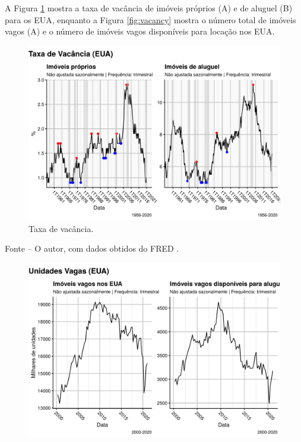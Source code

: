 \documentclass[
	12pt,				%
	oneside,			%
	a4paper,			%
	chapter=TITLE,		%
	section=TITLE,		%
	english,			%
	brazil				%
	]{abntex2}
\newcommand{\bcenter}{\begin{center}}
\newcommand{\ecenter}{\end{center}}
\begin{document}
\begin{refsection}
A Figura \ref{fig:vacancyRate} mostra a taxa de vacância de imóveis próprios (A)
e de aluguel (B) para os \gls{EUA}, enquanto a Figura \ref{fig:vacancy} mostra
o número total de imóveis vagos (A) e o número de imóveis vagos disponíveis para
locação nos EUA.
\begin{figure}[H]

{\centering \includegraphics[width=1\linewidth]{images/vacancyRate-1} 

}

\caption{Taxa de vacância.}\label{fig:vacancyRate}
\end{figure}
\bcenter

\small Fonte -- O autor, com dados obtidos do FRED \autocites{RHVRUSQ156N}{RRVRUSQ156N}.
\ecenter
\begin{figure}[H]

{\centering \includegraphics[width=1\linewidth]{images/vacancy-1} 

}
\end{figure}
\end{refsection}
\end{document}
